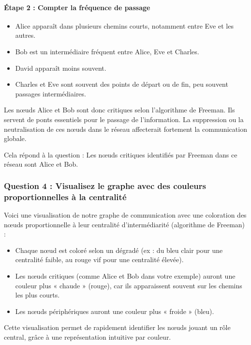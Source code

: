 \documentclass[12pt, a4paper]{article}
\begin{document}
		\paragraph{Étape 2 : Compter la fréquence de passage}
		\begin{itemize}
		\item Alice apparaît dans plusieurs chemins courts, notamment entre Eve et les autres.
		\item Bob est un intermédiaire fréquent entre Alice, Eve et Charles.
		\item David apparaît moins souvent.
		\item Charles et Eve sont souvent des points de départ ou de fin, peu souvent passages intermédiaires.
		\end{itemize}
		
		Les nœuds Alice et Bob sont donc critiques selon l'algorithme de Freeman. Ils servent de ponts essentiels pour le passage de l'information. La suppression ou la neutralisation de ces nœuds dans le réseau affecterait fortement la communication globale.
		
		Cela répond à la question : Les nœuds critiques identifiés par Freeman dans ce réseau sont Alice et Bob.
		
		\subsubsection*{Question 4 : Visualisez le graphe avec des couleurs proportionnelles à la centralité}
		
		Voici une visualisation de notre graphe de communication avec une coloration des nœuds proportionnelle à leur centralité d'intermédiarité (algorithme de Freeman) :
		
		\begin{itemize}
		\item Chaque nœud est coloré selon un dégradé (ex : du bleu clair pour une centralité faible, au rouge vif pour une centralité élevée).
		\item Les nœuds critiques (comme Alice et Bob dans votre exemple) auront une couleur plus « chaude » (rouge), car ils apparaissent souvent sur les chemins les plus courts.
		\item Les nœuds périphériques auront une couleur plus « froide » (bleu).
		\end{itemize}
		
		Cette visualisation permet de rapidement identifier les nœuds jouant un rôle central, grâce à une représentation intuitive par couleur.
		
\end{document}
